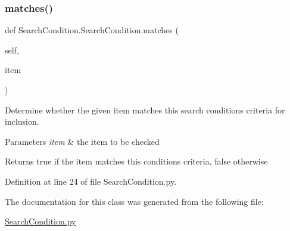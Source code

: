 \subsubsection{\texorpdfstring{matches()}{matches()}}
{\footnotesize\ttfamily def Search\+Condition.\+Search\+Condition.\+matches (\begin{DoxyParamCaption}\item[{}]{self,  }\item[{}]{item }\end{DoxyParamCaption})}



Determine whether the given item matches this search condition\textquotesingle{}s criteria for inclusion. 


\begin{DoxyParams}{Parameters}
{\em item} & the item to be checked \\
\hline
\end{DoxyParams}
\begin{DoxyReturn}{Returns}
true if the item matches this condition\textquotesingle{}s criteria, false otherwise 
\end{DoxyReturn}


Definition at line 24 of file Search\+Condition.\+py.



The documentation for this class was generated from the following file\+:\begin{DoxyCompactItemize}
\item 
\hyperlink{SearchCondition_8py}{Search\+Condition.\+py}\end{DoxyCompactItemize}
